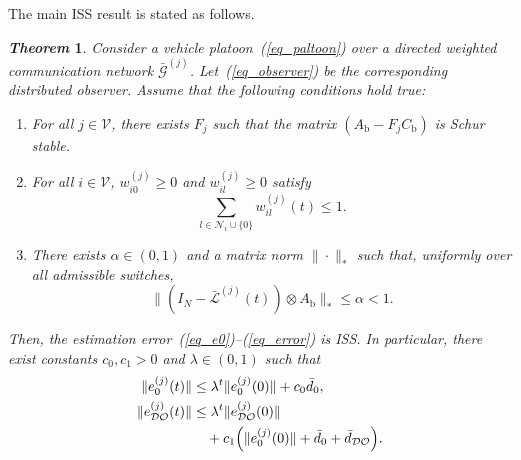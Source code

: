 \documentclass{ifacconf}
\def\eqref#1{(\ref{#1})}
\def\V{\mathcal{V}} %
\def\G{\mathcal{G}} %
\def\L{\mathcal{L}} %
\def\N{\mathcal{N}} %
\def\DO{\mathcal{DO}} %
\newtheorem{theorem}{\it \textbf{Theorem}}%
\begin{document}
The main ISS result is stated as follows.
\begin{theorem}\label{thm_observer}
Consider a vehicle platoon~\eqref{eq_paltoon} over a directed weighted communication network $\bar{\G}^{(j)}$. Let~\eqref{eq_observer} be the corresponding distributed observer. Assume that the following conditions hold true:
\begin{enumerate}
    \item For all $j \in \V$, there exists $F_{j}$ such that the matrix $\left( A_{\text{b}} - F_{j}C_{\text{b}} \right)$ is {\it Schur} stable.
    \item For all $i \in \V$, $w_{i0}^{(j)} \geq 0$ and $w_{il}^{(j)} \geq 0$ satisfy 
    \begin{equation}\label{thm_W}%
    \sum_{l\in \N_i\cup\{0\}} w_{il}^{(j)}(t) \leq 1.
    \end{equation}
    \item There exists $\alpha \in (0,1)$ and a matrix norm $\| \cdot \|_*$ such that, uniformly over all admissible switches,
	\begin{equation} \label{assume3}
        \| \left( I_{N} - \bar{\L}^{(j)}(t) \right)  \otimes  A_{\text{b}} \|_* \leq \alpha < 1.
	\end{equation}
\end{enumerate}
Then, the estimation error~\eqref{eq_e0}--\eqref{eq_error} is ISS. In particular, there exist constants $c_0, c_1 > 0$ and $\lambda \in (0,1)$ such that
%
\begin{align}
\|e_0^{(j)}(t)\| &\le \lambda^t \|e_0^{(j)}(0)\| + c_0 \bar{d}_0,\\
\|e_{\DO}^{(j)}(t)\| &\le \lambda^t \|e_{\DO}^{(j)}(0)\| \notag\\
&\quad+ c_1 \Big(\|e_0^{(j)}(0)\| + \bar{d}_0 + \bar{d}_{\DO}\Big).
\end{align}

\end{theorem}
\end{document}
